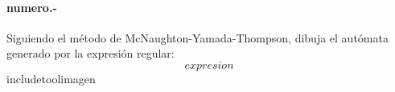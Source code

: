 

\paragraph{{numero}.-}\label{p{numero}}
Siguiendo el método de McNaughton-Yamada-Thompson, dibuja el autómata generado por la expresión regular:
\[
    {expresion}
\]
    {includetool}{{imagen}}
